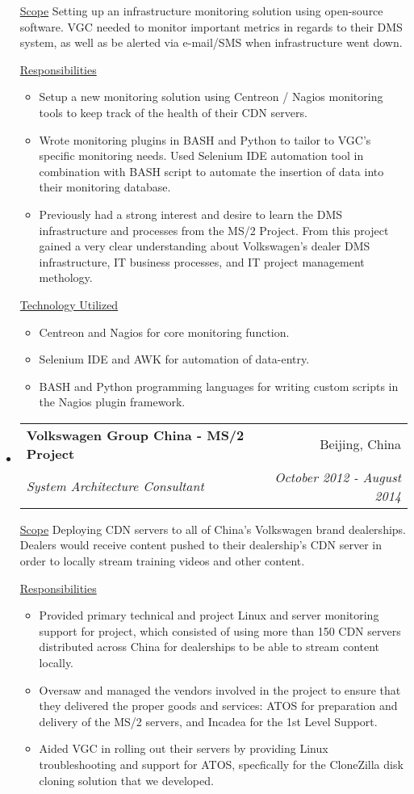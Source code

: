 \documentclass[a4paper,11pt]{article}
\makeatletter
\newcommand{\resitem}[1]{\item #1 \vspace{-2pt}}
\newcommand{\ressubheading}[4]{
\begin{tabular*}{6.5in}{l@{\cftdotfill{\cftsecdotsep}\extracolsep{\fill}}r}
		\textbf{#1} & #2 \\
		\textit{#3} & \textit{#4} \\
\end{tabular*}\vspace{-6pt}}
\makeatother
\begin{document}
\begin{itemize}
		\underline{Scope}
		\linebreak
		\linebreak
		Setting up an infrastructure monitoring solution using open-source software. VGC needed to monitor important metrics in regards to their DMS system, as well as be alerted via e-mail/SMS when infrastructure went down.

		\underline{Responsibilities}
		\begin{itemize}
			\resitem{Setup a new monitoring solution using Centreon / Nagios monitoring tools to keep track of the health of their CDN servers.}
			\resitem{Wrote monitoring plugins in BASH and Python to tailor to VGC's specific monitoring needs. Used Selenium IDE automation tool in combination with BASH script to automate the insertion of data into their monitoring database.}
			\resitem{Previously had a strong interest and desire to learn the DMS infrastructure and processes from the MS/2 Project. From this project gained a very clear understanding about Volkswagen's dealer DMS infrastructure, IT business processes, and IT project management methology.}
		\end{itemize}

		\underline{Technology Utilized}
		\begin{itemize}
			\resitem{Centreon and Nagios for core monitoring function.}
			\resitem{Selenium IDE and AWK for automation of data-entry.}
			\resitem{BASH and Python programming languages for writing custom scripts in the Nagios plugin framework.}
		\end{itemize}

	\item
		\ressubheading{Volkswagen Group China - MS/2 Project}{Beijing, China}{System Architecture Consultant}{October 2012 - August 2014}
		\linebreak
		\linebreak
		
		\underline{Scope}
		\linebreak
		\linebreak
		Deploying CDN servers to all of China's Volkswagen brand dealerships. Dealers would receive content pushed to their dealership's CDN server in order to locally stream training videos and other content.
		
		\underline{Responsibilities}
		\begin{itemize}
			\resitem{Provided primary technical and project Linux and server monitoring support for project, which consisted of using more than 150 CDN servers distributed across China for dealerships to be able to stream content locally.}
			\resitem{Oversaw and managed the vendors involved in the project to ensure that they delivered the proper goods and services: ATOS for preparation and delivery of the MS/2 servers, and Incadea for the 1st Level Support.}
			\resitem{Aided VGC in rolling out their servers by providing Linux troubleshooting and support for ATOS, specfically for the CloneZilla disk cloning solution that we developed.}
		\end{itemize}
		

\end{itemize}
\end{document}
